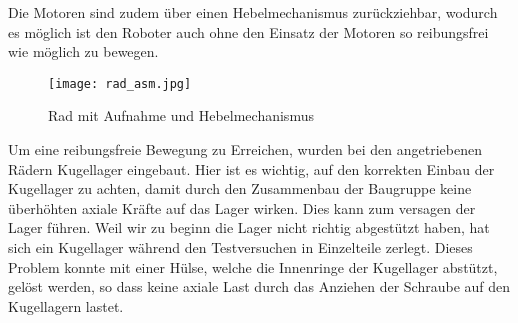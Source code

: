 Die Motoren sind zudem über einen Hebelmechanismus zurückziehbar, wodurch es möglich ist den Roboter auch ohne den Einsatz der Motoren so reibungsfrei wie möglich zu bewegen. 

\begin{figure}[H]
    \begin{center}
    \texttt{[image: rad\_asm.jpg]}
    \end{center}
    \caption{Rad mit Aufnahme und Hebelmechanismus}
\end{figure}

Um eine reibungsfreie Bewegung zu Erreichen, wurden bei den angetriebenen Rädern Kugellager eingebaut. Hier ist es wichtig, auf den korrekten Einbau der Kugellager zu achten, damit durch den Zusammenbau der Baugruppe keine überhöhten axiale Kräfte auf das Lager wirken. Dies kann zum versagen der Lager führen.  Weil wir zu beginn die Lager nicht richtig abgestützt haben, hat sich ein Kugellager während den Testversuchen in Einzelteile zerlegt. Dieses Problem konnte mit einer Hülse, welche die Innenringe der Kugellager abstützt, gelöst werden, so dass keine axiale Last durch das Anziehen der Schraube auf den Kugellagern lastet.